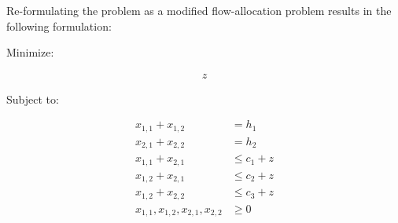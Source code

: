 Re-formulating the problem as a modified flow-allocation problem results in the
following formulation:

Minimize:

\begin{align*}
	z
\end{align*}

Subject to:

\begin{align*}
	x_{1,1} + x_{1,2} &= h_1 \\
	x_{2,1} + x_{2,2} &= h_2 \\
	x_{1,1} + x_{2,1} &\le c_1 + z \\
	x_{1,2} + x_{2,1} &\le c_2 + z \\
	x_{1,2} + x_{2,2} &\le c_3 + z \\
	x_{1,1},x_{1,2},x_{2,1},x_{2,2} &\ge 0
\end{align*}
